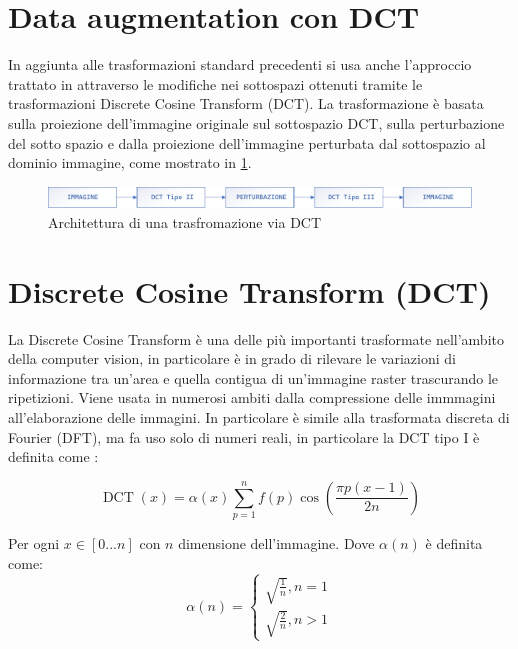 \section{Data augmentation con DCT}\label{data-augmentation-con-dct}

In aggiunta alle trasformazioni standard precedenti si usa anche l'approccio trattato in  \cite{nanni_dct_pca} attraverso le modifiche nei sottospazi ottenuti tramite le trasformazioni Discrete Cosine
Transform (DCT). La trasformazione è basata sulla proiezione dell'immagine originale sul sottospazio DCT, sulla perturbazione del sotto spazio e dalla proiezione dell'immagine perturbata dal sottospazio al dominio immagine, come mostrato in \cref{fig:dct-schema}.

\begin{figure}[ht]
    \centering
    \includegraphics[width=1\textwidth]{data-augmentation/dct-trasformazione.pdf}
    \caption{Architettura di una trasfromazione via DCT}
    \label{fig:dct-schema}
\end{figure}


\section{Discrete Cosine Transform (DCT)}\label{discrete-cosine-transform-dct}


La Discrete Cosine Transform è una delle più importanti trasformate nell'ambito della computer vision, in particolare è in grado di rilevare le  variazioni di informazione tra un'area e quella contigua di un'immagine raster trascurando le ripetizioni. Viene usata in numerosi ambiti dalla compressione delle immmagini all'elaborazione delle immagini. In particolare è simile alla  trasformata discreta di Fourier (DFT), ma fa uso solo di numeri reali, in particolare la DCT tipo I è definita come \cite{syed_dct} \cite{gonzalez_dip}:

\[ \operatorname{DCT}(x)=\alpha(x) \sum_{p=1}^{n} f(p) \cos \left(\frac { \pi p  (x- 1) } { 2 n }\right) \]

Per ogni \(x\in [0...n]\) con \(n\) dimensione dell'immagine. Dove \(\alpha(n)\) è definita come:
\[\alpha(n) = \left\{ \begin{array} { l } \sqrt { \frac { 1 } { n } } , n = 1 \\ \sqrt { \frac { 2 } { n } } , n > 1 \end{array} \right.\]

